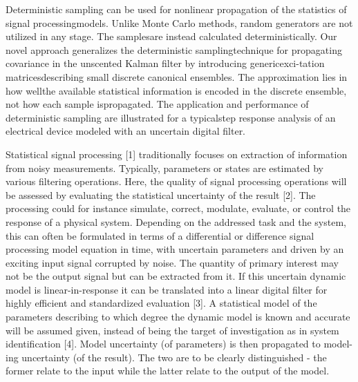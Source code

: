 \documentclass[11pt]{article}
\begin{document}
\citet{Hessling13a} Deterministic sampling can be used for nonlinear propagation of the statistics of signal processingmodels. Unlike Monte Carlo methods, random generators are not utilized in any stage. The samplesare instead calculated deterministically. Our novel approach generalizes the deterministic samplingtechnique for propagating covariance in the unscented Kalman filter by introducing genericexci-tation matricesdescribing small discrete canonical ensembles. The approximation lies in how wellthe available statistical information is encoded in the discrete ensemble, not how each sample ispropagated. The application and performance of deterministic sampling are illustrated for a typicalstep response analysis of an electrical device modeled with an uncertain digital filter.

\citet{Hessling13b} Statistical signal processing [1] traditionally focuses on extraction of information from noisy measurements. Typically, parameters or states are estimated by various filtering operations. Here, the quality of signal processing operations will be assessed by evaluating the statistical uncertainty of the result [2]. The processing could for instance simulate, correct, modulate, evaluate, or control the response of a physical system. Depending on the addressed task and the system, this can often be formulated in terms of a differential or difference signal processing model equation in time, with uncertain parameters and driven by an exciting input signal corrupted by noise. The quantity of primary interest may not be the output signal but can be extracted from it. If this uncertain dynamic model is linear-in-response it can be translated into a linear digital filter for highly efficient and standardized evaluation [3]. A statistical model of the parameters describing to which degree the dynamic model is known and accurate will be assumed given, instead of being the target of investigation as in system identification [4]. Model uncertainty (of parameters) is then propagated to model-ing uncertainty (of the result). The two are to be clearly distinguished - the former relate to the input while the latter relate to the output of the model. 
\end{document}
